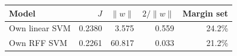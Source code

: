 \begin{tabular}{@{}lrrrr@{}}
\toprule
Model & $J$ & $\|w\|$ & $2/\|w\|$ & Margin set \\
\midrule
Own linear SVM & 0.2380 & 3.575 & 0.559 & 24.2\% \\
Own RFF SVM & 0.2261 & 60.817 & 0.033 & 21.2\% \\
\bottomrule
\end{tabular}
